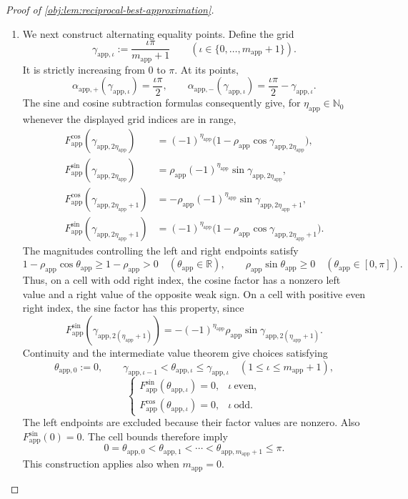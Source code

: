 \begin{proof}[Proof of \cref{obj:lem:reciprocal-best-approximation}]
\begin{enumerate}
\item We next construct alternating equality points. Define the grid
\[
\gamma_{\mathrm{app},\iota}
:=
\frac{\iota\pi}{m_{\mathrm{app}}+1}
\qquad
(\iota\in\{0,\ldots,m_{\mathrm{app}}+1\}).
\]
It is strictly increasing from \(0\) to \(\pi\). At its points,
\[
\alpha_{\mathrm{app},+}(\gamma_{\mathrm{app},\iota})
=\frac{\iota\pi}{2},
\qquad
\alpha_{\mathrm{app},-}(\gamma_{\mathrm{app},\iota})
=\frac{\iota\pi}{2}-\gamma_{\mathrm{app},\iota}.
\]
The sine and cosine subtraction formulas consequently give, for
\(\eta_{\mathrm{app}}\in\mathbb N_0\) whenever the displayed grid indices are in range,
\[
\begin{aligned}
F_{\mathrm{app}}^{\cos}(\gamma_{\mathrm{app},2\eta_{\mathrm{app}}})
&=(-1)^{\eta_{\mathrm{app}}}
\bigl(1-\rho_{\mathrm{app}}
\cos\gamma_{\mathrm{app},2\eta_{\mathrm{app}}}\bigr),\\
F_{\mathrm{app}}^{\sin}(\gamma_{\mathrm{app},2\eta_{\mathrm{app}}})
&=\rho_{\mathrm{app}}(-1)^{\eta_{\mathrm{app}}}
\sin\gamma_{\mathrm{app},2\eta_{\mathrm{app}}},\\
F_{\mathrm{app}}^{\cos}(\gamma_{\mathrm{app},2\eta_{\mathrm{app}}+1})
&=-\rho_{\mathrm{app}}(-1)^{\eta_{\mathrm{app}}}
\sin\gamma_{\mathrm{app},2\eta_{\mathrm{app}}+1},\\
F_{\mathrm{app}}^{\sin}(\gamma_{\mathrm{app},2\eta_{\mathrm{app}}+1})
&=(-1)^{\eta_{\mathrm{app}}}
\bigl(1-\rho_{\mathrm{app}}
\cos\gamma_{\mathrm{app},2\eta_{\mathrm{app}}+1}\bigr).
\end{aligned}
\]
The magnitudes controlling the left and right endpoints satisfy
\[
1-\rho_{\mathrm{app}}\cos\theta_{\mathrm{app}}
\ge1-\rho_{\mathrm{app}}>0
\quad(\theta_{\mathrm{app}}\in\mathbb R),
\qquad
\rho_{\mathrm{app}}\sin\theta_{\mathrm{app}}\ge0
\quad(\theta_{\mathrm{app}}\in[0,\pi]).
\]
Thus, on a cell with odd right index, the cosine factor has a nonzero left value and a right value of the opposite weak sign. On a cell with positive even right index, the sine factor has this property, since
\[
F_{\mathrm{app}}^{\sin}
(\gamma_{\mathrm{app},2(\eta_{\mathrm{app}}+1)})
=
-(-1)^{\eta_{\mathrm{app}}}\rho_{\mathrm{app}}
\sin\gamma_{\mathrm{app},2(\eta_{\mathrm{app}}+1)}.
\]
Continuity and the intermediate value theorem give choices satisfying
\[
\theta_{\mathrm{app},0}:=0,
\qquad
\gamma_{\mathrm{app},\iota-1}
<\theta_{\mathrm{app},\iota}
\le\gamma_{\mathrm{app},\iota}
\quad(1\le\iota\le m_{\mathrm{app}}+1),
\]
\[
\begin{cases}
F_{\mathrm{app}}^{\sin}(\theta_{\mathrm{app},\iota})=0,
&\iota\ \text{even},\\
F_{\mathrm{app}}^{\cos}(\theta_{\mathrm{app},\iota})=0,
&\iota\ \text{odd}.
\end{cases}
\]
The left endpoints are excluded because their factor values are nonzero. Also
\(F_{\mathrm{app}}^{\sin}(0)=0\). The cell bounds therefore imply
\[
0=\theta_{\mathrm{app},0}
<\theta_{\mathrm{app},1}<\cdots
<\theta_{\mathrm{app},m_{\mathrm{app}}+1}\le\pi.
\]
This construction applies also when \(m_{\mathrm{app}}=0\).


\end{enumerate}
\end{proof}
